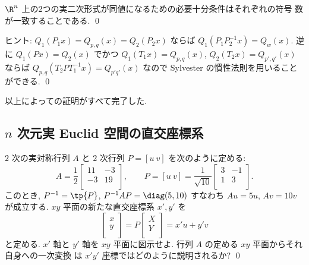 \documentclass[12pt,twoside]{jarticle}
\begin{document}

\begin{question}
\label{q:sylvester-4}
  $\R^n$ 上の2つの実二次形式が同値になるための必要十分条件はそれぞれの符号
  数が一致することである.  
  \qed
\end{question}

\noindent
ヒント: $Q_1(P_1x)=Q_{p,q}(x)=Q_2(P_2x)$ ならば $Q_1(P_1P_2^{-1}x)=Q_w(x)$.
逆に $Q_1(Px)=Q_2(x)$ でかつ $Q_1(T_1x)=Q_{p,q}(x)$,
$Q_2(T_2x)=Q_{p',q'}(x)$ ならば $Q_{p,q}(T_2PT_1^{-1}x)=Q_{p'q'}(x)$ なので
Sylvester の慣性法則を用いることができる.
\qed

\medskip

以上によっての証明がすべて完了した.


\subsection{$n$ 次元実 Euclid 空間の直交座標系}
\label{sec:orthogonal-coordinates}


\begin{question}
  $2$ 次の実対称行列 $A$ と $2$ 次行列 $P=[u\ v]$ を次のように定める:
  \begin{equation*}
    A = \frac{1}{2}
    \begin{bmatrix}
      11 & -3 \\
      -3 & 19 \\
    \end{bmatrix},
    \qquad
    P = [u\ v] =
    \frac{1}{\sqrt{10}}
    \begin{bmatrix}
      3 & -1 \\
      1 & 3  \\
    \end{bmatrix}.
  \end{equation*}
  このとき, $P^{-1}=\tp{P}$, $P^{-1}AP=\diag(5,10)$ 
  すなわち $Au=5u$, $Av=10v$ が成立する.
  $xy$ 平面の新たな直交座標系 $x',y'$ を
  \begin{equation*}
    \begin{bmatrix}
      x \\
      y \\
    \end{bmatrix}
    =
    P
    \begin{bmatrix}
      X \\
      Y \\
    \end{bmatrix} = x'u + y'v
  \end{equation*}
  と定める.  $x'$ 軸と $y'$ 軸を $xy$ 平面に図示せよ.
  行列 $A$ の定める $xy$ 平面からそれ自身への一次変換
  は $x'y'$ 座標ではどのように説明されるか?
  \qed
\end{question}
\end{document}
